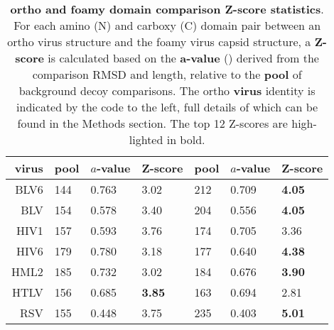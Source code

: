 \begin{table}
\begin{tabular}{r|lll|lll|}
\hline \hline
virus  & pool & $a$-value & Z-score & pool & $a$-value & Z-score \\
\hline
BLV6   &  144  & 0.763 &      3.02  &  212  & 0.709 & {\bf 4.05} \\
BLV    &  154  & 0.578 &      3.40  &  204  & 0.556 & {\bf 4.05} \\
HIV1   &  157  & 0.593 &      3.76  &  174  & 0.705 &      3.36  \\
HIV6   &  179  & 0.780 &      3.18  &  177  & 0.640 & {\bf 4.38} \\
HML2   &  185  & 0.732 &      3.02  &  184  & 0.676 & {\bf 3.90} \\
HTLV   &  156  & 0.685 & {\bf 3.85} &  163  & 0.694 &      2.81  \\
RSV    &  155  & 0.448 &      3.75  &  235  & 0.403 & {\bf 5.01} \\
\hline \hline
\end{tabular}
\begin{footnotesize}
\caption{
\label{Tab:Zscores}
{\bf ortho and foamy domain comparison Z-score statistics}.
For each amino (N) and carboxy (C) domain pair between an ortho virus structure and the foamy virus capsid structure,
a {\bf Z-score} is calculated based on the {\bf a-value} () derived from the comparison RMSD and length,
relative to the {\bf pool} of background decoy comparisons.   The ortho {\bf virus} identity is indicated by the 
code to the left, full details of which can be found in the Methods section.
The top 12 Z-scores are high-lighted in bold.
}
\end{footnotesize}
\end{table}

